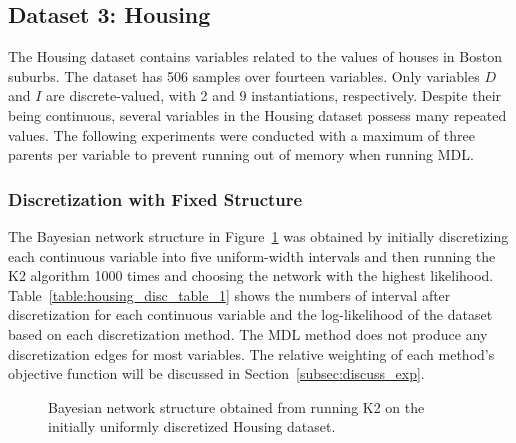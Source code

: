 \subsection{Dataset 3: Housing}
\label{subsec:housing}

The Housing dataset contains variables related to the values of houses in Boston suburbs.
The dataset has \num{506} samples over fourteen variables.
Only variables $D$ and $I$ are discrete-valued, with \num{2} and \num{9} instantiations, respectively.
Despite their being continuous, several variables in the Housing dataset possess many repeated values.
The following experiments were conducted with a maximum of three parents per variable to prevent running out of memory when running MDL.

\subsubsection{Discretization with Fixed Structure}
\label{subsubsec:housing_exp1}

The Bayesian network structure in Figure~\ref{fig:housing_graph_1} was obtained by initially discretizing each continuous variable into five uniform-width intervals and then running the K2 algorithm \num{1000} times and choosing the network with the highest likelihood.
Table~\ref{table:housing_disc_table_1} shows the numbers of interval after discretization for each continuous variable and the log-likelihood of the dataset based on each discretization method.
The MDL method does not produce any discretization edges for most variables.
The relative weighting of each method's objective function will be discussed in Section~\ref{subsec:discuss_exp}.


\begin{figure}[ht]
  \centering
  \scalebox{0.8}{}
  \caption{Bayesian network structure obtained from running K2 on the initially uniformly discretized Housing dataset.}
  \label{fig:housing_graph_1}
\end{figure}

